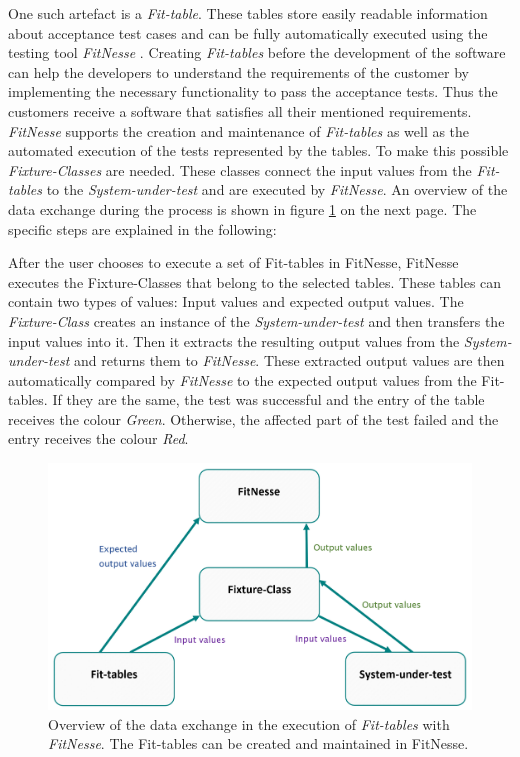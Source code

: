 One such artefact is a \textit{Fit-table}. 
These tables store easily readable information about acceptance test cases and can be fully automatically executed using the testing tool \textit{FitNesse} \cite{fitnesse}.
Creating \textit{Fit-tables} before the development of the software can help the developers to understand the requirements of the customer by implementing the necessary functionality to pass the acceptance tests.
Thus the customers receive a software that satisfies all their mentioned requirements.
\textit{FitNesse} supports the creation and maintenance of \textit{Fit-tables} as well as the automated execution of the tests represented by the tables.
To make this possible \textit{Fixture-Classes} are needed.
These classes connect the input values from the \textit{Fit-tables} to the \textit{System-under-test} and are executed by \textit{FitNesse}.
An overview of the data exchange during the process is shown in figure \ref{fig:overview-fitnesse} on the next page.
The specific steps are explained in the following:

After the user chooses to execute a set of Fit-tables in FitNesse, FitNesse executes the Fixture-Classes that belong to the selected tables.
These tables can contain two types of values: Input values and expected output values.
The \textit{Fixture-Class} creates an instance of the \textit{System-under-test} and then transfers the input values into it.
Then it extracts the resulting output values from the \textit{System-under-test} and returns them to \textit{FitNesse}.
These extracted output values are then automatically compared by \textit{FitNesse} to the expected output values from the Fit-tables.
If they are the same, the test was successful and the entry of the table receives the colour \textit{Green}.
Otherwise, the affected part of the test failed and the entry receives the colour \textit{Red}.

\begin{figure}[H]
	\centering
	\includegraphics[width=.75\textwidth]{../images/fitnesse-overview.png}
	\caption{Overview of the data exchange in the execution of \textit{Fit-tables} with \textit{FitNesse}. The Fit-tables can be created and maintained in FitNesse.}
	\label{fig:overview-fitnesse}
\end{figure}


